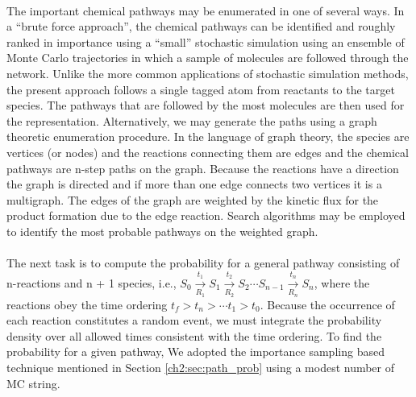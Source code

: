 \paragraph{}
The important chemical pathways may be enumerated in one
of several ways. In a “brute force approach”, the chemical
pathways can be identified and roughly ranked in importance
using a “small” stochastic simulation using an ensemble of
Monte Carlo trajectories in which a sample of molecules are
followed through the network. Unlike the more common
applications of stochastic simulation methods, the present
approach follows a single tagged atom from reactants to the
target species.\cite{ch3_21_mcquarrie1967stochastic,ch3_22_gillespie1976general,ch3_23_gibson2000efficient,ch3_24_gillespie2013perspective} The pathways that are followed by the most molecules are then used for the representation. Alternatively,
we may generate the paths using a graph theoretic enumeration procedure. In the language of graph theory, the species are
vertices (or nodes) and the reactions connecting them are
edges and the chemical pathways are n-step paths on the graph.
Because the reactions have a direction the graph is directed and
if more than one edge connects two vertices it is a multigraph.
The edges of the graph are weighted by the kinetic flux for the
product formation due to the edge reaction. Search algorithms
may be employed to identify the most probable pathways on
the weighted graph.
\newline
\paragraph{}
The next task is to compute the probability for a general
pathway consisting of n-reactions and n + 1 species, i.e., $S_{0} \xrightarrow[R_1]{t_1} S_1\xrightarrow[R_2]{t_2} S_2 \cdots  S_{n-1} \xrightarrow[R_n]{t_n} S_n$, where the reactions obey the time ordering $t_f > t_n > \cdots t_1 > t_0$. Because the occurrence of each reaction constitutes a random event, we must integrate the probability
density over all allowed times consistent with the time ordering.
To find the probability for a given pathway, We adopted the importance sampling based technique mentioned in Section \ref{ch2:sec:path_prob} using a modest number of MC string.
\newline
